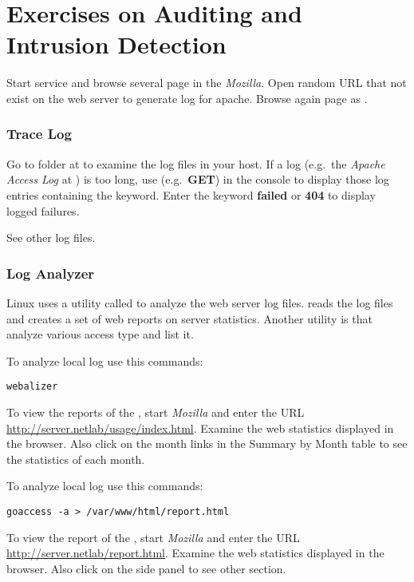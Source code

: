 \documentclass{../UTNetLab}
\begin{document}
\part{Exercises on Auditing and Intrusion Detection}
Start  service and browse several page in the \textit{Mozilla}.
Open random URL that not exist on the web server to generate log for apache.
Browse again page as .

\section{Trace Log}
Go to  folder at  to examine the log files in your host.
If a log (e.g.\ the \textit{Apache Access Log} at ) is too long, use  (e.g.\ \textbf{GET}) in the {console} to display those log entries containing the keyword.
Enter the keyword \textbf{failed} or \textbf{404} to display logged failures.

See other log files.

\section{Log Analyzer}
Linux uses a utility called  to analyze the web server log files.
 reads the  log files and creates a set of web reports on server statistics.
Another utility is  that analyze various access type and list it.

To analyze local log use this commands:
\begin{lstlisting}
webalizer
    \end{lstlisting}

To view the reports of the , start \textit{Mozilla} and enter the URL \url{http://server.netlab/usage/index.html}.
Examine the web statistics displayed in the browser.
Also click on the month links in the Summary by Month table to see the statistics of each month.

To analyze local log use this commands:
\begin{lstlisting}
goaccess -a > /var/www/html/report.html
    \end{lstlisting}

To view the report of the , start \textit{Mozilla} and enter the URL \url{http://server.netlab/report.html}.
Examine the web statistics displayed in the browser.
Also click on the side panel to see other section.
\end{document}
